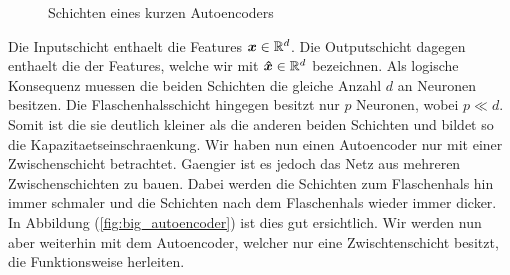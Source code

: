 \begin{figure}[h!]
  \centering
  \label{fig:basic_autoencoder}
  \caption{Schichten eines kurzen Autoencoders}
\end{figure}
\para{}
Die Inputschicht enthaelt die Features $\bm{x} \in \mathbb{R}^d$. Die Outputschicht dagegen
enthaelt die  der Features, welche wir mit $\bm{\hat{x}} \in \mathbb{R}^d$
bezeichnen. Als logische Konsequenz muessen die beiden Schichten die gleiche
Anzahl $d$ an Neuronen besitzen.
Die Flaschenhalsschicht hingegen besitzt nur $p$ Neuronen, wobei $p \ll d$.
Somit ist die sie deutlich kleiner als die anderen beiden Schichten und bildet
so die Kapazitaetseinschraenkung.
\para{}
Wir haben nun einen Autoencoder nur mit einer Zwischenschicht betrachtet.
Gaengier ist es jedoch das Netz aus mehreren Zwischenschichten zu bauen. Dabei
werden die Schichten zum Flaschenhals hin immer schmaler und die Schichten nach
dem Flaschenhals wieder immer dicker. In Abbildung (\ref{fig:big_autoencoder})
ist dies gut ersichtlich. Wir werden nun aber weiterhin mit dem Autoencoder,
welcher nur eine Zwischtenschicht besitzt, die Funktionsweise herleiten.

